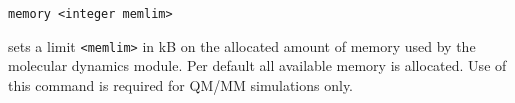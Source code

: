 \begin{description}
\item
\begin{verbatim}
memory <integer memlim>
\end{verbatim}
sets a limit \verb+<memlim>+ in kB on the allocated amount of memory used by 
the molecular dynamics module.
Per default all available memory is allocated. Use of this command
is required for QM/MM simulations only.
\end{description}
